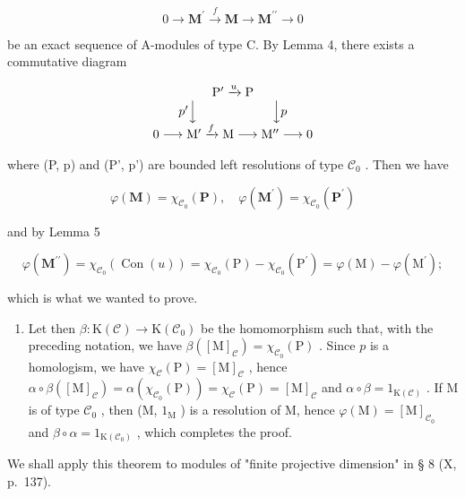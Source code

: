 \[
0 \to \mathbf {M} ^ {\prime} \xrightarrow {f} \mathbf {M} \to \mathbf {M} ^ {\prime \prime} \to 0
\]

be an exact sequence of A-modules of type C. By Lemma 4, there exists a commutative diagram

\[
\begin{array}{c} \mathrm{P} ^ {\prime} \xrightarrow {u} \mathrm{P} \\ p ^ {\prime} \Big \downarrow \qquad \qquad \qquad \Big \downarrow p \\ 0 \longrightarrow \mathrm{M} ^ {\prime} \xrightarrow {f} \mathrm{M} \longrightarrow \mathrm{M} ^ {\prime \prime} \longrightarrow 0 \end{array}
\]

where (P, p) and (P', p') are bounded left resolutions of type \(\mathcal{C}_0\) . Then we have

\[
\varphi (\mathbf {M}) = \chi_ {\mathcal {C} _ {0}} (\mathbf {P}), \quad \varphi (\mathbf {M} ^ {\prime}) = \chi_ {\mathcal {C} _ {0}} (\mathbf {P} ^ {\prime})
\]

and by Lemma 5

\[
\varphi (\mathbf {M} ^ {\prime \prime}) = \chi_ {\mathcal {C} _ {0}} (\operatorname{Con} (u)) = \chi_ {\mathcal {C} _ {0}} (\mathrm{P}) - \chi_ {\mathcal {C} _ {0}} (\mathrm{P} ^ {\prime}) = \varphi (\mathrm{M}) - \varphi (\mathrm{M} ^ {\prime});
\]

which is what we wanted to prove.

\begin{enumerate}
\def\labelenumi{\alph{enumi})}
\setcounter{enumi}{2}
\tightlist
\item
  Let then \(\beta: \mathrm{K}(\mathcal{C}) \to \mathrm{K}(\mathcal{C}_0)\) be the homomorphism such that, with the preceding notation, we have \(\beta([\mathrm{M}]_{\mathcal{C}}) = \chi_{\mathcal{C}_0}(\mathrm{P})\) . Since \(p\) is a homologism, we have \(\chi_{\mathcal{C}}(\mathrm{P}) = [\mathrm{M}]_{\mathcal{C}}\) , hence \(\alpha \circ \beta([\mathrm{M}]_{\mathcal{C}}) = \alpha(\chi_{\mathcal{C}_0}(\mathrm{P})) = \chi_{\mathcal{C}}(\mathrm{P}) = [\mathrm{M}]_{\mathcal{C}}\) and \(\alpha \circ \beta = 1_{\mathrm{K}(\mathcal{C})}\) . If M is of type \(\mathcal{C}_0\) , then (M, \(1_{\mathrm{M}}\) ) is a resolution of M, hence \(\varphi(\mathrm{M}) = [\mathrm{M}]_{\mathcal{C}_0}\) and \(\beta \circ \alpha = 1_{\mathrm{K}(\mathcal{C}_0)}\) , which completes the proof.
\end{enumerate}

We shall apply this theorem to modules of "finite projective dimension" in § 8 (X, p.~137).

